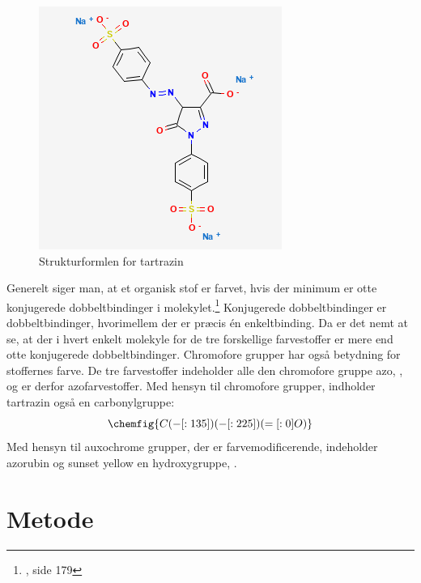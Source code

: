 \documentclass[11pt]{article}
\theoremstyle{definition}
\begin{document}
\begin{figure}[H]
\begin{center}
  \includegraphics[scale=1]{tartrazin.png}
\end{center}
\caption{Strukturformlen for tartrazin}
\label{fig:tar}
\end{figure}
Generelt siger man, at et organisk stof er farvet, hvis der minimum er otte konjugerede dobbeltbindinger i molekylet.\footnote{\cite{Mygind2022}, side 179} 
Konjugerede dobbeltbindinger er dobbeltbindinger, hvorimellem der er præcis én enkeltbinding.
Da er det nemt at se, at der i hvert enkelt molekyle for de tre forskellige farvestoffer er mere end otte konjugerede dobbeltbindinger.
Chromofore grupper har også betydning for stoffernes farve.
De tre farvestoffer indeholder alle den chromofore gruppe azo, , og er derfor azofarvestoffer. 
Med hensyn til chromofore grupper, indholder tartrazin også en carbonylgruppe: 
\[
\chemfig{C(-[:135])(-[:225])(=[:0]O)}
\] 
Med hensyn til auxochrome grupper, der er farvemodificerende, indeholder azorubin og sunset yellow en hydroxygruppe, .

\section{Metode}
\end{document}

